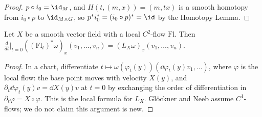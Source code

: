 \begin{proof}
  \leanok
  $p \circ i_0 = \id_M$, and $H(t, (m, x)) = (m, t x)$ is a smooth homotopy from $i_0 \circ p$
  to $\id_{M \times G}$, so $p^* i_0^* = (i_0 \circ p)^* = \id$ by the Homotopy Lemma.
\end{proof}

\begin{theorem}
  \label{thm:lie-flow}
  \leanok
  Let $X$ be a smooth vector field with a local $C^2$-flow $\mathrm{Fl}$. Then
  $\frac{d}{dt}\big|_{t=0} ((\mathrm{Fl}_t)^*\omega)_x(v_1, \dots, v_n) = (L_X\omega)_x(v_1, \dots,
  v_n)$.
\end{theorem}

\begin{proof}
  \leanok
  In a chart, differentiate $t \mapsto \omega(\varphi_t(y))(\dd\varphi_t(y)v_1, \dots)$, where
  $\varphi$ is the local flow: the base point moves with velocity $X(y)$, and
  $\partial_t \dd\varphi_t(y) v = \dd X(y) v$ at $t = 0$ by exchanging the order of
  differentiation in $\partial_t \varphi = X \circ \varphi$. This is the local formula for $L_X$.
  Glöckner and Neeb assume $C^1$-flows; we do not claim this argument is new.
\end{proof}

